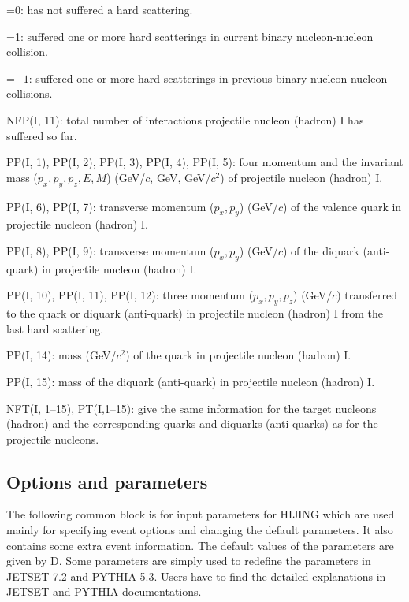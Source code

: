 \begin{description}
\begin{description}
        \itemsep=-4.0pt
                \item{}=0: has not  suffered a hard scattering.
                \item{}=1: suffered one or more hard scatterings in
                        current binary nucleon-nucleon collision.
                \item{}=$-1$: suffered one or more hard scatterings in
                        previous binary nucleon-nucleon collisions.
        \end{description}
        \vspace{-4.0pt}
\item{}NFP(I, 11): total number of interactions projectile nucleon (hadron)
                I  has suffered so far.
\item{}PP(I, 1), PP(I, 2), PP(I, 3), PP(I, 4), PP(I, 5): four momentum and
                the invariant mass ($p_x,p_y,p_z,E,M$) 
                (GeV/$c$, GeV, GeV/$c^2$) of projectile nucleon (hadron) I.
\item{}PP(I, 6), PP(I, 7): transverse momentum ($p_x,p_y$) (GeV/$c$) of the 
                valence quark in projectile nucleon (hadron) I.
\item{}PP(I, 8), PP(I, 9): transverse momentum ($p_x,p_y$) (GeV/$c$) of the 
                diquark (anti-quark) in projectile nucleon (hadron) I.
\item{}PP(I, 10), PP(I, 11), PP(I, 12): three momentum ($p_x,p_y,p_z$) 
                (GeV/$c$) transferred to the quark or diquark (anti-quark)
                in projectile nucleon (hadron) I from the last hard 
                scattering.
\item{}PP(I, 14): mass (GeV/$c^2$) of the quark in projectile nucleon
                (hadron) I.
\item{}PP(I, 15): mass of the diquark (anti-quark) in projectile
                nucleon (hadron) I.
\item{}NFT(I, 1--15), PT(I,1--15): give the same 
                information for the target nucleons (hadron) and the 
                corresponding quarks and diquarks (anti-quarks) as for
                the projectile nucleons.
\end{description}




\subsection{Options and parameters}

        
        The following common block is for input parameters for HIJING
which are used mainly for specifying event options and changing the
default parameters. It also contains some extra event information.
The default values of the parameters are given by D. Some parameters
are simply used to redefine the parameters in JETSET 7.2 and PYTHIA 5.3.
Users have to find the detailed explanations in JETSET and PYTHIA
documentations.

